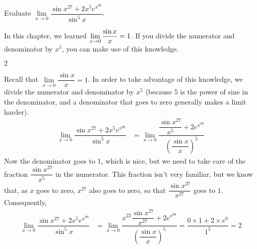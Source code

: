 \begin{question}[2011H]
Evaluate $\lim\limits_{x\rightarrow 0}
                 \dfrac{\sin x^{27}+2x^5 e^{x^{99}}}{\sin^5 x}$.
\end{question}
\begin{hint}
In this chapter, we learned $\displaystyle\lim_{x \to 0}\dfrac{\sin x}{x}=1$. If you divide the numerator and denominator by $x^5$, you can make use of this knowledge.
\end{hint}
\begin{answer} $2$
\end{answer}
\begin{solution}
Recall that $\lim\limits_{x\rightarrow 0}\dfrac{\sin x}{x} =1$. In order to take advantage of this knowledge, we divide the numerator and denominator by $x^5$ (because $5$ is the power of sine in the denominator, and a denominator that goes to zero generally makes a limit harder).
\begin{align*}
\lim_{x\rightarrow 0}  \dfrac{\sin x^{27}+2x^5 e^{x^{99}}}{\sin^5 x}
&=\lim_{x\rightarrow 0}  \dfrac{\dfrac{\sin x^{27}}{x^{5}}+2 e^{x^{99}}}
                                {\left(\dfrac{\sin x}{x}\right)^5}
\end{align*}
Now the denominator goes to 1, which is nice, but we need to take care of the fraction $\dfrac{\sin x^{27}}{x^5}$ in the numerator. This fraction isn't very familiar, but we know that, as $x$ goes to zero, $x^{27}$ also goes to zero,
so that $\dfrac{\sin x^{27}}{x^{27}}$ goes to $1$. Consequently,
\begin{align*}
\lim_{x\rightarrow 0}  \dfrac{\sin x^{27}+2x^5 e^{x^{99}}}{\sin^5 x}
&=\lim_{x\rightarrow 0}  \dfrac{x^{22}\dfrac{\sin x^{27}}{x^{27}}+2 e^{x^{99}}}
                                {\left(\dfrac{\sin x}{x}\right)^5}
=\dfrac{0\times 1+2\times e^0}{1^5}
=2
\end{align*}

\end{solution}
